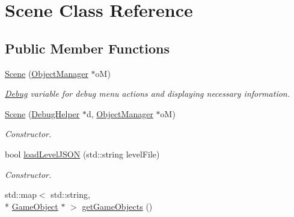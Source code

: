 \hypertarget{class_scene}{\section{Scene Class Reference}
\label{class_scene}
}
\subsection*{Public Member Functions}
\begin{DoxyCompactItemize}
\item 
\hypertarget{class_scene_a196045cf0bd3b0b915c627744e413a0b}{\hyperlink{class_scene_a196045cf0bd3b0b915c627744e413a0b}{Scene} (\hyperlink{class_object_manager}{Object\+Manager} $\ast$o\+M)}\label{class_scene_a196045cf0bd3b0b915c627744e413a0b}

\begin{DoxyCompactList}\small\item\em \hyperlink{class_debug}{Debug} variable for debug menu actions and displaying necessary information. \end{DoxyCompactList}\item 
\hypertarget{class_scene_adad88c7667e5d67bb28c4ec4bf3a22dc}{\hyperlink{class_scene_adad88c7667e5d67bb28c4ec4bf3a22dc}{Scene} (\hyperlink{class_debug_helper}{Debug\+Helper} $\ast$d, \hyperlink{class_object_manager}{Object\+Manager} $\ast$o\+M)}\label{class_scene_adad88c7667e5d67bb28c4ec4bf3a22dc}

\begin{DoxyCompactList}\small\item\em Constructor. \end{DoxyCompactList}\item 
\hypertarget{class_scene_ad524a6e4cec067e9b1a59be767453cdd}{bool \hyperlink{class_scene_ad524a6e4cec067e9b1a59be767453cdd}{load\+Level\+J\+S\+O\+N} (std\+::string level\+File)}\label{class_scene_ad524a6e4cec067e9b1a59be767453cdd}

\begin{DoxyCompactList}\small\item\em Constructor. \end{DoxyCompactList}\item 
\hypertarget{class_scene_aa5d4a784fe62d15fb083f8b73c3b4f94}{std\+::map$<$ std\+::string, \\*
\hyperlink{class_game_object}{Game\+Object} $\ast$ $>$ \hyperlink{class_scene_aa5d4a784fe62d15fb083f8b73c3b4f94}{get\+Game\+Objects} ()}\label{class_scene_aa5d4a784fe62d15fb083f8b73c3b4f94}


\end{DoxyCompactItemize}
